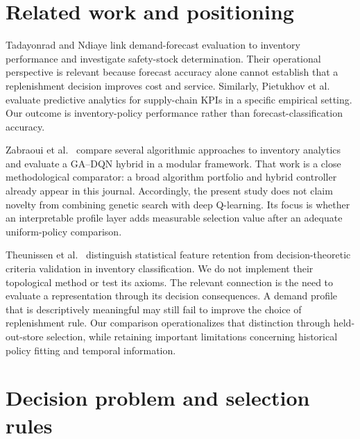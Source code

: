 \documentclass[preprint,12pt]{elsarticle}
\begin{document}
\section{Related work and positioning}
Tadayonrad and Ndiaye \cite{sca_f81ad2b3e023} link demand-forecast evaluation to inventory performance and investigate safety-stock determination. Their operational perspective is relevant because forecast accuracy alone cannot establish that a replenishment decision improves cost and service. Similarly, Pietukhov et al.\ \cite{sca_92a549559870} evaluate predictive analytics for supply-chain KPIs in a specific empirical setting. Our outcome is inventory-policy performance rather than forecast-classification accuracy.

Zabraoui et al.\ \cite{sca_27e994c54848} compare several algorithmic approaches to inventory analytics and evaluate a GA--DQN hybrid in a modular framework. That work is a close methodological comparator: a broad algorithm portfolio and hybrid controller already appear in this journal. Accordingly, the present study does not claim novelty from combining genetic search with deep Q-learning. Its focus is whether an interpretable profile layer adds measurable selection value after an adequate uniform-policy comparison.

Theunissen et al.\ \cite{sca_c5c06dcbc9e5} distinguish statistical feature retention from decision-theoretic criteria validation in inventory classification. We do not implement their topological method or test its axioms. The relevant connection is the need to evaluate a representation through its decision consequences. A demand profile that is descriptively meaningful may still fail to improve the choice of replenishment rule. Our comparison operationalizes that distinction through held-out-store selection, while retaining important limitations concerning historical policy fitting and temporal information.

\section{Decision problem and selection rules}
\end{document}
